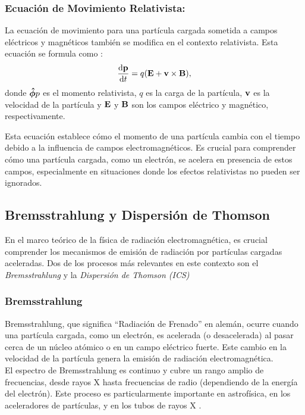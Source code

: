 \subsubsection*{Ecuación de Movimiento Relativista: } 

La ecuación de movimiento para una partícula cargada sometida a campos eléctricos y magnéticos también se modifica en el contexto relativista. Esta ecuación se formula como \cite{esarey2003physics}:
\begin{equation}
    \dv{\vb{p}}{t} = q(\vb{E} + \vb{v} \times \vb{B}),
\end{equation}
donde $\boldsymbol{\hat{\phi}}{p}$ es el momento relativista, $q$ es la carga de la partícula, $\vb{v}$ es la velocidad de la partícula y $\vb{E}$ y $\vb{B}$ son los campos eléctrico y magnético, respectivamente.

Esta ecuación establece cómo el momento de una partícula cambia con el tiempo debido a la influencia de campos electromagnéticos. Es crucial para comprender cómo una partícula cargada, como un electrón, se acelera en presencia de estos campos, especialmente en situaciones donde los efectos relativistas no pueden ser ignorados.


\subsection{Bremsstrahlung y Dispersión de Thomson}
En el marco teórico de la física de radiación electromagnética, es crucial comprender los mecanismos de emisión de radiación por partículas cargadas aceleradas. Dos de los procesos más relevantes en este contexto son el \textit{Bremsstrahlung} y la \textit{Dispersión de Thomson (ICS)}

\subsubsection{Bremsstrahlung}
Bremsstrahlung, que significa ``Radiación de Frenado'' en alemán, ocurre cuando una partícula cargada, como un electrón, es acelerada (o desacelerada) al pasar cerca de un núcleo atómico o en un campo eléctrico fuerte. Este cambio en la velocidad de la partícula genera la emisión de radiación electromagnética. \\

El espectro de Bremsstrahlung es continuo y cubre un rango amplio de frecuencias, desde rayos X hasta frecuencias de radio (dependiendo de la energía del electrón). Este proceso es particularmente importante en astrofísica, en los aceleradores de partículas, y en los tubos de rayos X \cite{rybicki1991radiative, jackson2021classical}. \\

